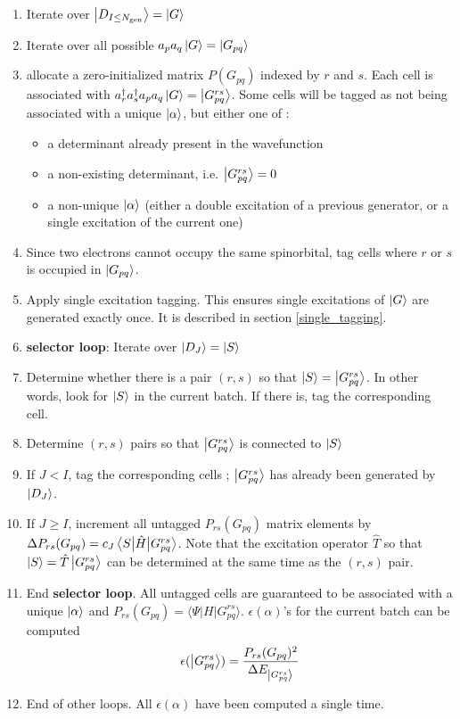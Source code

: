 \documentclass[./thesis.tex]{subfiles}
\newcommand{\Gpqrs}{\ket{G^{rs}_{pq}}}
\begin{document}
\begin{enumerate}
\item
Iterate over $\ket {D_{I \leq {N_\text{gen}}}} = \ket G$
\item
Iterate over all possible $a_p a_q \ket G = \ket {G_{pq}}$
\item
allocate a zero-initialized matrix $P(G_{pq})$ indexed by $r$ and $s$. Each cell is associated with $a^\dagger_r a^\dagger_s a_p a_q  \ket G = \Gpqrs$. Some cells will be tagged as not being associated with a unique $\ket \alpha$, but either one of :
\begin{itemize}
\item
a determinant already present in the wavefunction
\item
a non-existing determinant, i.e. $\Gpqrs = 0$
\item
a non-unique $\ket \alpha$ (either a double excitation of a previous generator, or a single excitation of the current one)
\end{itemize}

\item
Since two electrons cannot occupy the same spinorbital, tag cells where $r$ or $s$ is occupied in $\ket {G_{pq}}$.
\item
Apply single excitation tagging. This ensures single excitations of $\ket G$ are generated exactly once. It is described in section \ref{single_tagging}.
\item
\textbf{selector loop}: Iterate over $\ket {D_J} = \ket S$ 
\item
Determine whether there is a pair $(r,s)$ so that $\ket S = \ket {G_{pq}^{rs}}$. In other words, look for $\ket S$ in the current batch. If there is, tag the corresponding cell.
\item
Determine $(r,s)$ pairs so that $\ket {G_{pq}^{rs}}$ is connected to $\ket S$
\item
If $J<I$, tag the corresponding cells ; $\ket {G_{pq}^{rs}}$ has already been generated by $\ket {D_J}$.
\item
If $J \geq I$, increment all untagged $P_{rs}(G_{pq})$ matrix elements by $\Delta P_{rs}(G_{pq}) = c_J \mel{S}{\hat{H}}{G^{rs}_{pq}}$. Note that the excitation operator $\hat{T}$ so that $\ket S=\hat{T} \Gpqrs$ can be determined at the same time as the $(r,s)$ pair.
\item
End \textbf{selector loop}. All untagged cells are guaranteed to be associated with a unique $\ket \alpha$ and $P_{rs}(G_{pq}) = \langle \Psi |H|G^{rs}_{pq} \rangle$. $\epsilon(\alpha)$'s for the current batch can be computed  \\

\begin{equation}
\epsilon(\ket {G_{pq}^{rs}}) = \frac{P_{rs}(G_{pq})^2}{\Delta E_{\Gpqrs}}
\end{equation}
\item
End of other loops. All $\epsilon(\alpha)$ have been computed a single time.

\end{enumerate}
\end{document}
